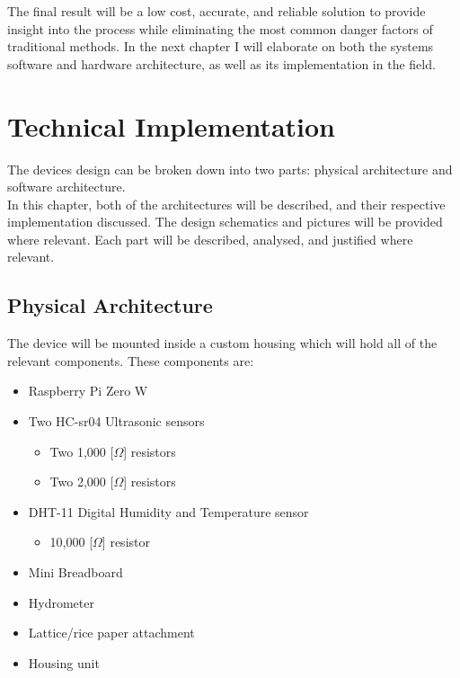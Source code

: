 \documentclass[twoside]{ctuthesis}
\theoremstyle{plain}
\theoremstyle{definition}
\theoremstyle{note}
\begin{document}
The final result will be a low cost, accurate, and reliable solution to provide insight into the process while eliminating the most common danger factors of traditional methods. In the next chapter I will elaborate on both the systems software and hardware architecture, as well as its implementation in the field.


\pagebreak

\begingroup
\renewcommand{\cleardoublepage}{}
\renewcommand{\clearpage}{}
\chapter{Technical Implementation}
\endgroup

The devices design can be broken down into two parts: physical architecture and software architecture.\\
In this chapter, both of the architectures will be described, and their respective implementation discussed. The design schematics and pictures will be provided where relevant. Each part will be described, analysed, and justified where relevant.

\section{Physical Architecture}

The device will be mounted inside a custom housing which will hold all of the relevant components. These components are:

\begin{itemize}
	\item Raspberry Pi Zero W
	\item Two HC-sr04 Ultrasonic sensors
	\begin{itemize}
		\item Two 1,000 [$\Omega$] resistors
		\item Two 2,000 [$\Omega$] resistors
	\end{itemize}
	\item DHT-11 Digital Humidity and Temperature sensor
	\begin{itemize}
		\item 10,000 [$\Omega$] resistor
	\end{itemize}
	\item Mini Breadboard
	\item Hydrometer
	\item Lattice/rice paper attachment
	\item Housing unit
\end{itemize}
\end{document}
